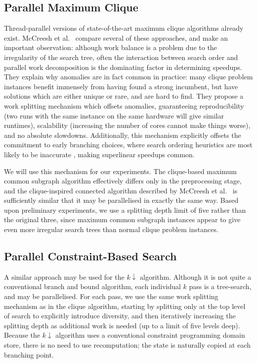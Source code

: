 \documentclass{llncs}
\begin{document}
\subsection{Parallel Maximum Clique}

Thread-parallel versions of state-of-the-art maximum clique algorithms already exist.
McCreesh et al.\ \cite{DBLP:journals/topc/McCreeshP15} compare several of these approaches, and make
an important observation: although work balance is a problem due to the irregularity of the search
tree, often the interaction between search order and parallel work decomposition is the dominating
factor in determining speedups. They explain why anomalies are in fact common in practice: many
clique problem instances benefit immensely from having found a strong incumbent, but have solutions
which are either unique or rare, and are hard to find. They propose a work splitting mechanism which
offsets anomalies, guaranteeing reproducibility (two runs with the same instance on the same
hardware will give similar runtimes), scalability (increasing the number of cores cannot make things
worse), and no absolute slowdowns.  Additionally, this mechanism explicitly offsets the commitment
to early branching choices, where search ordering heuristics are most likely to be inaccurate
\cite{DBLP:conf/ijcai/HarveyG95,DBLP:conf/cp/ChuSS09}, making superlinear speedups common.

We will use this mechanism for our experiments.  The clique-based maximum common subgraph algorithm
effectively differs only in the preprocessing stage, and the clique-inspired connected algorithm
described by McCreesh et al.\ \cite{DBLP:conf/cp/McCreeshNPS16} is sufficiently similar that it may be parallelised in
exactly the same way. Based upon preliminary experiments, we use a splitting depth limit of five
rather than the original three, since maximum common subgraph instances appear to give even more
irregular search trees than normal clique problem instances.

\subsection{Parallel Constraint-Based Search}

A similar approach may be used for the $k{\downarrow}$ algorithm. Although it is not quite a
conventional branch and bound algorithm, each individual $k$ pass is a tree-search, and may be
parallelised. For each pass, we use the same work splitting mechanism as in the clique algorithm,
starting by splitting only at the top level of search to explicitly introduce diversity, and then
iteratively increasing the splitting depth as additional work is needed (up to a limit of five
levels deep).  Because the $k{\downarrow}$ algorithm uses a conventional constraint programming
domain store, there is no need to use recomputation; the state is naturally copied at each branching
point.
\end{document}
